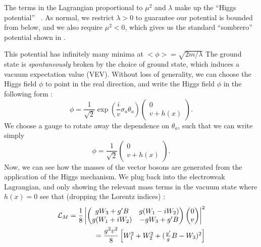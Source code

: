The terms in the Lagrangian  proportional to $\mu^2$ and $\lambda$ make up the ``Higgs potential'' ~\cite{Higgs:1964pj}.
As normal, we restrict $\lambda > 0$ to guarantee our potential is bounded from below, and we also require $\mu^2 < 0$, which gives us the standard ``sombrero'' potential shown in .

This potential has infinitely many minima at $<\phi> = \sqrt{2m/\lambda}$
The ground state is \textit{spontaneously} broken by the choice of ground state, which induces a vacuum expectation value (VEV).
Without loss of generality, we can choose the Higgs field $\phi$ to point in the real direction, and write the Higgs field $\phi$ in the following form :
\begin{equation}
\phi = \frac{1}{\sqrt{2}} \exp( \frac{i}{v} \sigma_a \theta_a ) \begin{pmatrix} 0 \\ v + h(x) \end{pmatrix}.
\end{equation}
We choose a gauge to rotate away the dependence on $\theta_a$, such that we can write simply
\begin{equation}
\label{eq:higgs_field_after_ssb}
\phi = \frac{1}{\sqrt{2}} \begin{pmatrix} 0 \\ v + h(x) \end{pmatrix}.
\end{equation}
Now, we can see how the masses of the vector bosons are generated from the application of the Higgs mechanism.
We plug  back into the electroweak Lagrangian, and only showing the relevant mass terms in the vacuum state where $h(x) = 0$  see that (dropping the Lorentz indices) :
\begin{align}
\mathcal{L}_M = \frac{1}{8} \begin{vmatrix} \begin{pmatrix} gW_3 + g'B & g(W_1 - iW_2)\\ g(W_1 + iW_2) & -gW_3 + g'B \end{pmatrix}  \begin{pmatrix} 0  \\ v \end{pmatrix} \end{vmatrix}^2\\ = \frac{g^2 v^2}{8} \begin{bmatrix} W_1^2 + W_2^2 + (\frac{g'}{g}B - W_3)^2 \end{bmatrix} \notag
\end{align}

